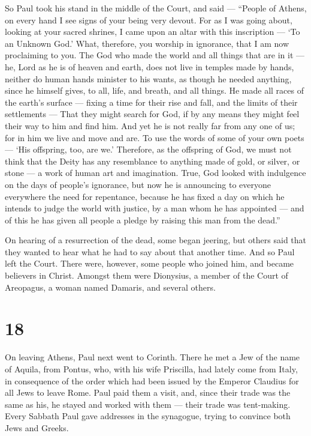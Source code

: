  So Paul took his stand in the middle of the Court, and
said --- ``People of Athens, on every hand I see signs of your being
very devout.  For as I was going about, looking at your
sacred shrines, I came upon an altar with this inscription --- `To an
Unknown God.' What, therefore, you worship in ignorance, that I am now
proclaiming to you.  The God who made the world and all
things that are in it --- he, Lord as he is of heaven and earth, does
not live in temples made by hands,  neither do human hands
minister to his wants, as though he needed anything, since he himself
gives, to all, life, and breath, and all things.  He made
all races of the earth's surface --- fixing a time for their rise and
fall, and the limits of their settlements ---  That they
might search for God, if by any means they might feel their way to him
and find him. And yet he is not really far from any one of us;
 for in him we live and move and are. To use the words of
some of your own poets --- `His offspring, too, are we.' 
Therefore, as the offspring of God, we must not think that the Deity has
any resemblance to anything made of gold, or silver, or stone --- a work
of human art and imagination.  True, God looked with
indulgence on the days of people's ignorance, but now he is announcing
to everyone everywhere the need for repentance,  because he
has fixed a day on which he intends to judge the world with justice, by
a man whom he has appointed --- and of this he has given all people a
pledge by raising this man from the dead.''

 On hearing of a resurrection of the dead, some began
jeering, but others said that they wanted to hear what he had to say
about that another time.  And so Paul left the Court.
 There were, however, some people who joined him, and
became believers in Christ. Amongst them were Dionysius, a member of the
Court of Areopagus, a woman named Damaris, and several others.

\hypertarget{section-17}{%
\section{18}\label{section-17}}

 On leaving Athens, Paul next went to Corinth. 
There he met a Jew of the name of Aquila, from Pontus, who, with his
wife Priscilla, had lately come from Italy, in consequence of the order
which had been issued by the Emperor Claudius for all Jews to leave
Rome. Paul paid them a visit,  and, since their trade was
the same as his, he stayed and worked with them --- their trade was
tent-making.  Every Sabbath Paul gave addresses in the
synagogue, trying to convince both Jews and Greeks.

